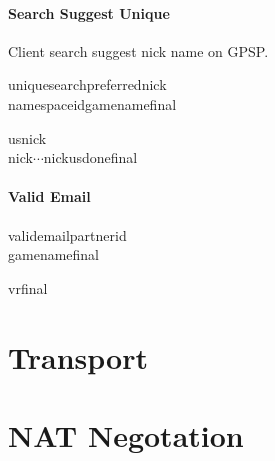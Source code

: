 \documentclass[oneside,titlepage,a4paper]{Definition/retrospy} %
\begin{document}
\subsection{Search Suggest Unique}

Client search suggest nick name on GPSP.

\ClientRequest
\begin{mybox}
	\tbs uniquesearch\tbs\tbs preferrednick\tbs<unique nick name>\\
	\tbs namespaceid\tbs<namespace id>\tbs gamename\tbs<game name>\tbs final\tbs
\end{mybox}
\ServerResponse
\begin{mybox}
	\tbs us\tbs<number of suggest nick>\tbs nick\tbs <nick name1>\\
	\tbs nick\tbs<nick name2>\tbs $\cdots$\tbs nick\tbs <nick name n>\tbs usdone\tbs final\tbs
\end{mybox}


\subsection{Valid Email}
\ClientRequest
\begin{mybox}
	\tbs valid\tbs\tbs email\tbs<email account>\tbs partnerid\tbs <partner id>\\
	\tbs gamename\tbs<game name>\tbs final\tbs
\end{mybox}

\ServerResponse
\begin{mybox}
	\tbs vr\tbs<valid value>\tbs final\tbs
\end{mybox}



\part{Transport}






\part{NAT Negotation}
\end{document}
